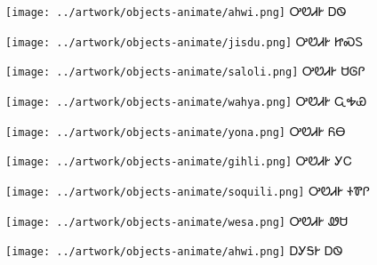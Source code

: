 \documentclass[avery5371]{flashcards}%
\begin{document}
\begin{flashcard}{
\texttt{[image: ../artwork/objects-animate/ahwi.png]}
}\Huge ᎤᏬᏗᎨ ᎠᏫ
\end{flashcard}

\begin{flashcard}{
\texttt{[image: ../artwork/objects-animate/jisdu.png]}
}\Huge ᎤᏬᏗᎨ ᏥᏍᏚ
\end{flashcard}

\begin{flashcard}{
\texttt{[image: ../artwork/objects-animate/saloli.png]}
}\Huge ᎤᏬᏗᎨ ᏌᎶᎵ
\end{flashcard}

\begin{flashcard}{
\texttt{[image: ../artwork/objects-animate/wahya.png]}
}\Huge ᎤᏬᏗᎨ ᏩᎭᏯ
\end{flashcard}

\begin{flashcard}{
\texttt{[image: ../artwork/objects-animate/yona.png]}
}\Huge ᎤᏬᏗᎨ ᏲᎾ
\end{flashcard}

\begin{flashcard}{
\texttt{[image: ../artwork/objects-animate/gihli.png]}
}\Huge ᎤᏬᏗᎨ ᎩᏟ
\end{flashcard}

\begin{flashcard}{
\texttt{[image: ../artwork/objects-animate/soquili.png]}
}\Huge ᎤᏬᏗᎨ ᏐᏈᎵ
\end{flashcard}

\begin{flashcard}{
\texttt{[image: ../artwork/objects-animate/wesa.png]}
}\Huge ᎤᏬᏗᎨ ᏪᏌ
\end{flashcard}

\begin{flashcard}{
\texttt{[image: ../artwork/objects-animate/ahwi.png]}
}\Huge ᎠᎩᎦᎨ ᎠᏫ
\end{flashcard}
\end{document}
